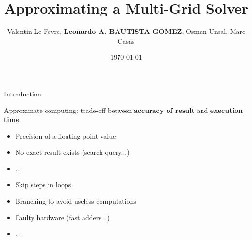 \documentclass[hyperref={pdfpagelabels=false}]{beamer}
\title{Approximating a Multi-Grid Solver}
\author[Leonardo Bautista-Gomez]{Valentin Le Fevre, \textbf{Leonardo A. BAUTISTA GOMEZ}, Osman Unsal, Marc Casas}
\date{\today}
\begin{document}
\begin{frame}
 \maketitle
\end{frame}

\begin{frame}{Introduction}

 Approximate computing: trade-off between \textbf{accuracy of result} and \textbf{execution time}.

  \pause
  \begin{itemize}
    \item Precision of a floating-point value
    \item No exact result exists (search query...)
    \item ...
  \end{itemize}
  \pause
  \begin{itemize}
   \item Skip steps in loops
   \item Branching to avoid useless computations
   \item Faulty hardware (fast adders...)
   \item ...
  \end{itemize}

\end{frame}
\end{document}
